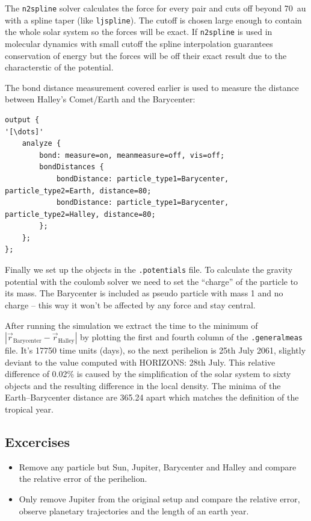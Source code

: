 The \texttt{n2spline} solver calculates the force for every pair and cuts
off beyond \SI{70}{\astronomicalunit} with a spline taper (like
\texttt{ljspline}). The cutoff is chosen large enough to contain the
whole solar system so the forces will be exact. If \texttt{n2spline} is
used in molecular dynamics with small cutoff the spline interpolation
guarantees conservation of energy but the forces will be off their exact
result due to the characterstic of the potential.

The bond distance measurement covered earlier is used to measure the
distance between Halley's Comet/Earth and the Barycenter:
\begin{lstlisting}[escapechar=']
output {
'[\dots]'
    analyze {
        bond: measure=on, meanmeasure=off, vis=off;
        bondDistances {
            bondDistance: particle_type1=Barycenter, particle_type2=Earth, distance=80;
            bondDistance: particle_type1=Barycenter, particle_type2=Halley, distance=80;
        };
    };
};
\end{lstlisting}

Finally we set up the objects in the \texttt{.potentials} file. To
calculate the gravity potential with the coulomb solver we need to set
the ``charge'' of the particle to its mass. The Barycenter is included
as pseudo particle with mass 1 and no charge -- this way it won't be
affected by any force and stay central.

After running the simulation we extract the time to the minimum of
$|\vec r_\mathrm{Barycenter}-\vec r_\mathrm{Halley}|$ by plotting the
first and fourth column of the \texttt{.generalmeas} file. It's 17750
time units (days), so the next perihelion is 25th July 2061, slightly
deviant to the value computed with HORIZONS: 28th July. This relative
difference of 0.02\% is caused by the simplification of the solar system
to sixty objects and the resulting difference in the local density. The
minima of the Earth--Barycenter distance are \SI{365.24}{\siday} apart
which matches the definition of the tropical year. 

\subsection{Excercises}
\begin{itemize}
    \item Remove any particle but Sun, Jupiter, Barycenter and Halley
        and compare the relative error of the perihelion.
    \item Only remove Jupiter from the original setup and compare the
        relative error, observe planetary trajectories and the length of an
        earth year.
\end{itemize}


